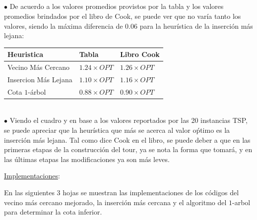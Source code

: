 \documentclass[10pt,a4paper]{report}
\begin{document}
\ \\\\\\\\
$\bullet$ De acuerdo a los valores promedios provistos por la tabla y los valores promedios brindados por el libro de Cook, se puede ver que no var\'ia tanto los valores, siendo la m\'axima diferencia de $0.06$ para la heur\'istica de la inserci\'on m\'as lejana:
\begin{table}[htbp]
\begin{center}
\begin{tabular}{|l|l|l|}
\hline
Heuristica & Tabla & Libro Cook\\
\hline
Vecino M\'as Cercano & $1.24\times OPT$ & $1.26\times OPT$\\
Insercion M\'as Lejana & $1.10\times OPT$ & $1.16\times OPT$\\
Cota $1$-\'arbol & $0.88\times OPT$ & $0.90 \times OPT$\\ 
\hline
\end{tabular}
\end{center}
\end{table}
\\
$\bullet$ Viendo el cuadro y en base a los valores reportados por las 20 instancias TSP, se puede apreciar que la heur\'istica que m\'as se acerca al valor o\'ptimo es la inserci\'on m\'as lejana. Tal como dice Cook en el libro, se puede deber a que en las primeras etapas de la construcci\'on del tour, ya se nota la forma que tomar\'a, y en las \'ultimas etapas las modificaciones ya son m\'as leves.
\begin{flushleft}
\underline{Implementaciones}:\\
\end{flushleft}
En las siguientes 3 hojas se muestran las implementaciones de los c\'odigos del vecino m\'as cercano mejorado, la inserci\'on m\'as cercana y el algoritmo del $1$-arbol para determinar la cota inferior.
\end{document}

